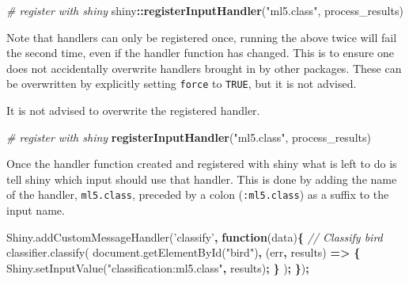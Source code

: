 \documentclass[10pt,]{krantz}
\makeatletter
\newenvironment{Shaded}{\begin{snugshade}}{\end{snugshade}}
\newcommand{\AttributeTok}[1]{\textcolor[rgb]{0.61,0.61,0.61}{#1}}
\newcommand{\CommentTok}[1]{\textcolor[rgb]{0.37,0.37,0.37}{\textit{#1}}}
\newcommand{\KeywordTok}[1]{\textcolor[rgb]{0.27,0.27,0.27}{\textbf{#1}}}
\newcommand{\NormalTok}[1]{#1}
\newcommand{\OperatorTok}[1]{\textcolor[rgb]{0.43,0.43,0.43}{\textbf{#1}}}
\newcommand{\StringTok}[1]{\textcolor[rgb]{0.5,0.5,0.5}{#1}}
\newcommand{\VariableTok}[1]{\textcolor[rgb]{0,0,0}{#1}}
\newenvironment{kframe}{%
\medskip{}
\setlength{\fboxsep}{.8em}
 \def\at@end@of@kframe{}%
 \ifinner\ifhmode%
  \def\at@end@of@kframe{\end{minipage}}%
  \begin{minipage}{\columnwidth}%
 \fi\fi%
 \def\FrameCommand##1{\hskip\@totalleftmargin \hskip-\fboxsep
 \colorbox{shadecolor}{##1}\hskip-\fboxsep
     \hskip-\linewidth \hskip-\@totalleftmargin \hskip\columnwidth}%
 \MakeFramed {\advance\hsize-\width
   \@totalleftmargin\z@ \linewidth\hsize
   \@setminipage}}%
 {\par\unskip\endMakeFramed%
 \at@end@of@kframe}
\renewenvironment{Shaded}{\begin{kframe}}{\end{kframe}}
\newenvironment{rmdblock}[1]
  {
  \begin{itemize}
  \renewcommand{\labelitemi}{
    \raisebox{-.7\height}[0pt][0pt]{
      {\setkeys{Gin}{width=3em,keepaspectratio}\texttt{[image: images/\#1]}}
    }
  }
  \setlength{\fboxsep}{1em}
  \begin{kframe}
  \item
  }
  {
  \end{kframe}
  \end{itemize}
  }
\newenvironment{rmdnote}
  {\begin{rmdblock}{note}}
  {\end{rmdblock}}
\makeatother
\begin{document}
\begin{Shaded}
\begin{Highlighting}[]
\CommentTok{# register with shiny}
\NormalTok{shiny}\OperatorTok{::}\KeywordTok{registerInputHandler}\NormalTok{(}\StringTok{"ml5.class"}\NormalTok{, process_results)}
\end{Highlighting}
\end{Shaded}

Note that handlers can only be registered once, running the above twice will fail the second time, even if the handler function has changed. This is to ensure one does not accidentally overwrite handlers brought in by other packages. These can be overwritten by explicitly setting \texttt{force} to \texttt{TRUE}, but it is not advised.

\begin{rmdnote}
It is not advised to overwrite the registered handler.
\end{rmdnote}

\begin{Shaded}
\begin{Highlighting}[]
\CommentTok{# register with shiny}
\KeywordTok{registerInputHandler}\NormalTok{(}\StringTok{"ml5.class"}\NormalTok{, process_results)}
\end{Highlighting}
\end{Shaded}

Once the handler function created and registered with shiny what is left to do is tell shiny which input should use that handler. This is done by adding the name of the handler, \texttt{ml5.class}, preceded by a colon (\texttt{:ml5.class}) as a suffix to the input name.

\begin{Shaded}
\begin{Highlighting}[]
\VariableTok{Shiny}\NormalTok{.}\AttributeTok{addCustomMessageHandler}\NormalTok{(}\StringTok{'classify'}\OperatorTok{,} \KeywordTok{function}\NormalTok{(data)}\OperatorTok{\{}
  \CommentTok{// Classify bird}
  \VariableTok{classifier}\NormalTok{.}\AttributeTok{classify}\NormalTok{(}
    \VariableTok{document}\NormalTok{.}\AttributeTok{getElementById}\NormalTok{(}\StringTok{"bird"}\NormalTok{)}\OperatorTok{,}\NormalTok{ (err}\OperatorTok{,}\NormalTok{ results) }\KeywordTok{=>} \OperatorTok{\{}
      \VariableTok{Shiny}\NormalTok{.}\AttributeTok{setInputValue}\NormalTok{(}\StringTok{"classification:ml5.class"}\OperatorTok{,}\NormalTok{ results)}\OperatorTok{;}
    \OperatorTok{\}}
\NormalTok{  )}\OperatorTok{;}
\OperatorTok{\}}\NormalTok{)}\OperatorTok{;}
\end{Highlighting}
\end{Shaded}
\end{document}
